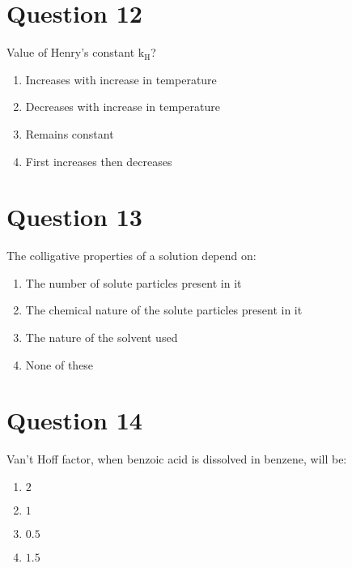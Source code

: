 \documentclass{article}
\begin{document}
\section*{Question 12}
Value of Henry's constant \(\mathrm{k_H}\)?\newline
\begin{enumerate}[label=(\alph*)]
\item Increases with increase in temperature
\item Decreases with increase in temperature
\item Remains constant
\item First increases then decreases
\end{enumerate}
\newpage
\section*{Question 13}
The colligative properties of a solution depend on:
\begin{enumerate}[label=(\alph*)]
\item The number of solute particles present in it
\item The chemical nature of the solute particles present in it
\item The nature of the solvent used
\item None of these
\end{enumerate}
\newpage
\section*{Question 14}
Van't Hoff factor, when benzoic acid is dissolved in benzene, will be:
\begin{enumerate}[label=(\alph*)]
\item \(2\)
\item \(1\)
\item \(0.5\)
\item \(1.5\)
\end{enumerate}
\newpage
\end{document}

